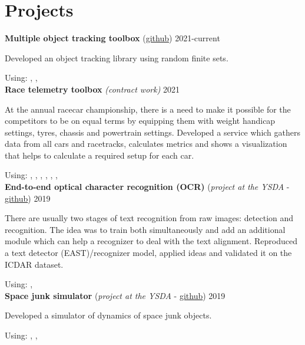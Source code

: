 \section*{\sectionformat Projects}
\textbf{Multiple object tracking toolbox} (\href{https://github.com/neer201/Multi-Object-Tracking-for-Automotive-Systems-in-python}{github}) \hfill 2021-current
\par
Developed an object tracking library using random finite sets.

Using: , , 
\\
% 
\textbf{Race telemetry toolbox} \textit{(contract work)} \hfill 2021
\par
At the annual racecar championship, there is a need to make it possible for the competitors to be on equal terms by equipping them with weight handicap settings, tyres, chassis and powertrain settings.
Developed a service which gathers data from all cars and racetracks, calculates metrics and shows a visualization that helps to calculate a required setup for each car.

Using: , , , , , , 
\\
\textbf{End-to-end optical character recognition (OCR)} (\textit{project at the YSDA} - \href{https://github.com/neer201/end2end_OCR}{github})  \hfill 2019
\par
There are usually two stages of text recognition from raw images: detection and recognition. The idea was to train both simultaneously and add an additional module which can help a recognizer to deal with the text alignment. Reproduced a text detector (EAST)/recognizer model, applied ideas and validated it on the ICDAR dataset.

Using: , 
% 
\\
\textbf{Space junk simulator} (\textit{project at the YSDA} - \href{https://github.com/neer201/space_junk_simulator}{github})   \hfill 2019
\par
Developed a simulator of dynamics of space junk objects.

Using: , , 
